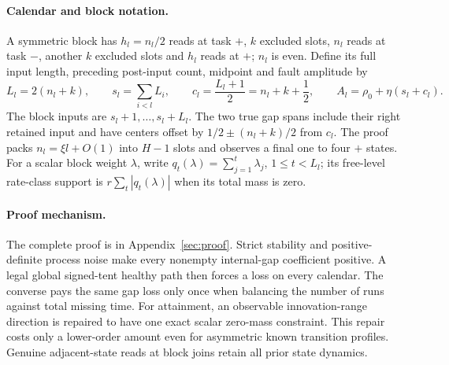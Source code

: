 \documentclass[11pt]{article}
\begin{document}
\paragraph{Calendar and block notation.}
A symmetric block has $h_l=n_l/2$ reads at task $+$, $k$ excluded slots,
$n_l$ reads at task $-$, another $k$ excluded slots and $h_l$ reads at $+$;
$n_l$ is even. Define its full input length, preceding post-input count,
midpoint and fault amplitude by
\[
L_l=2(n_l+k),\qquad s_l=\sum_{i<l}L_i,\qquad
c_l=\frac{L_l+1}{2}=n_l+k+\frac12,\qquad
A_l=\rho_0+\eta(s_l+c_l).
\]
The block inputs are $s_l+1,\ldots,s_l+L_l$.
The two true gap spans include their right retained input and have centers
offset by $1/2\pm(n_l+k)/2$ from $c_l$.
The proof packs $n_l=\xi l+O(1)$ into $H-1$ slots and observes a final
one to four $+$ states. For a scalar block weight $\lambda$, write
$q_t(\lambda)=\sum_{j=1}^t\lambda_j$, $1\le t<L_l$;
its free-level rate-class support is $r\sum_t|q_t(\lambda)|$ when its total
mass is zero.

\paragraph{Proof mechanism.}
The complete proof is in Appendix~\ref{sec:proof}.
Strict stability and positive-definite process noise make every nonempty
internal-gap coefficient positive. A legal global signed-tent healthy path
then forces a loss on every calendar. The converse pays the same gap loss
only once when balancing the number of runs against total missing time.
For attainment, an observable innovation-range direction is repaired to have
one exact scalar zero-mass constraint. This repair costs only a lower-order
amount even for asymmetric known transition profiles. Genuine adjacent-state
reads at block joins retain all prior state dynamics.
\end{document}

